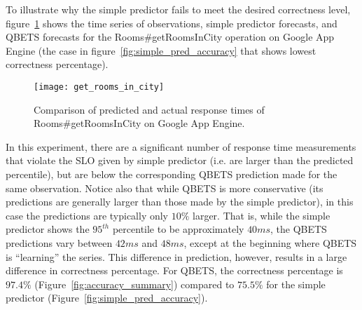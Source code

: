 To illustrate why the simple predictor fails to meet the desired correctness 
level, figure~\ref{fig:get_rooms_in_city} shows the time series of observations, simple predictor forecasts,
and QBETS forecasts for the 
Rooms\#getRoomsInCity operation on Google App
Engine (the case in figure~\ref{fig:simple_pred_accuracy} that shows 
lowest correctness percentage).
\begin{figure}
\centering
\texttt{[image: get\_rooms\_in\_city]}
\caption{Comparison of predicted and actual response times of Rooms\#getRoomsInCity on Google App Engine.}
\label{fig:get_rooms_in_city}
\end{figure}

In this experiment, there are a significant number of response
time measurements that violate the SLO given by simple predictor (i.e. are
larger than the predicted percentile), but are below the corresponding QBETS
prediction made for the same observation.
Notice also that while QBETS is more conservative (its predictions are
generally larger than those made by the simple predictor), in this case the
predictions are typically only $10\%$ larger.  That is, while the 
simple predictor shows the $95^{th}$ percentile to be approximately $40ms$,
the QBETS predictions vary between $42ms$ and $48ms$, except at the beginning
where QBETS is ``learning'' the series. This difference in prediction,
however, results in a large difference in correctness percentage.  For QBETS,
the correctness percentage is $97.4\%$ (Figure~\ref{fig:accuracy_summary}) compared to
$75.5\%$ for the simple predictor (Figure~\ref{fig:simple_pred_accuracy}).


